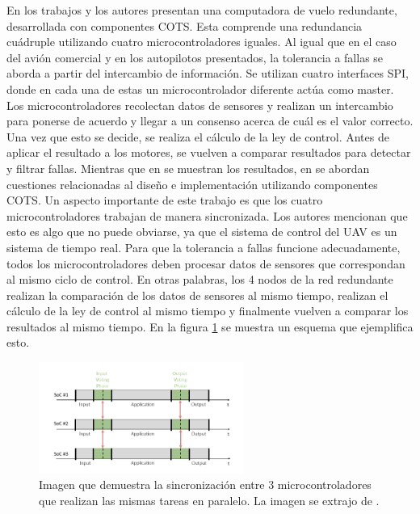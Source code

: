 En los trabajos \cite{hiergeist2018implementation} y \cite{hiergeist2017internal} los autores presentan una computadora de vuelo redundante, desarrollada con componentes COTS. Esta comprende una redundancia cuádruple utilizando cuatro microcontroladores iguales. Al igual que en el caso del avión comercial y en los autopilotos presentados, la tolerancia a fallas se aborda a partir del intercambio de información. Se utilizan cuatro interfaces SPI, donde en cada una de estas un microcontrolador diferente actúa como master. Los microcontroladores recolectan datos de sensores y realizan un intercambio para ponerse de acuerdo y llegar a un consenso acerca de cuál es el valor correcto. Una vez que esto se decide, se realiza el cálculo de la ley de control. Antes de aplicar el resultado a los motores, se vuelven a comparar resultados para detectar y filtrar fallas. Mientras que en \cite{hiergeist2018implementation} se muestran los resultados, en \cite{hiergeist2017internal} se abordan cuestiones relacionadas al diseño e implementación utilizando componentes COTS. Un aspecto importante de este trabajo es que los cuatro microcontroladores trabajan de manera sincronizada. Los autores mencionan que esto es algo que no puede obviarse, ya que el sistema de control del UAV es un sistema de tiempo real. Para que la tolerancia a fallas funcione adecuadamente, todos los microcontroladores deben procesar datos de sensores que correspondan al mismo ciclo de control. En otras palabras, los 4 nodos de la red redundante realizan la comparación de los datos de sensores al mismo tiempo, realizan el cálculo de la ley de control al mismo tiempo y finalmente vuelven a comparar los resultados al mismo tiempo. En la figura \ref{fig:frame_lock_approach} se muestra un esquema que ejemplifica esto.

\begin{figure}[H]
    \centering
    \includegraphics[width=0.6\textwidth]{img/frame_lock_approach.png}
    \caption{Imagen que demuestra la sincronización entre 3 microcontroladores que realizan las mismas tareas en paralelo. La imagen se extrajo de \cite{hiergeist2017internal}.}
    \label{fig:frame_lock_approach}
\end{figure}

